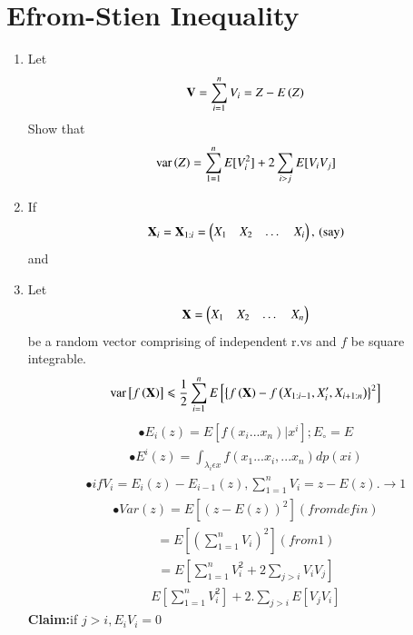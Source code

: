 \documentclass[journal,12pt,twocolumn]{IEEEtran}
\renewcommand\thesection{\arabic{section}}
\begin{document}
\section{Efrom-Stien Inequality}
\begin{enumerate}[label=\thesection.\arabic*,ref=\thesection.\theenumi]
\item Let
\begin{align}
\mathbf{V}= \sum_{i=1}^{n}{V}_i = Z - E\left(Z\right)
\end{align}
Show that 
\begin{align}
\text{var} \left(Z\right) = \sum_{1=1}^{n}E[ V_i^2]+2\sum_{i>j}E[V_i V_j]
\end{align}
\item If
\begin{align}
\mathbf{X}_i = \mathbf{X}_{1:i}=\begin{pmatrix}X_1 & X_2 & \dots & X_i\end{pmatrix},\, \text{(say)}
\end{align}
%
and
\item Let
\begin{align}
\mathbf{X}= \begin{pmatrix}X_1 & X_2 &  \dots & X_n\end{pmatrix}
\end{align}
be a random vector comprising of independent r.vs and $f$ be  square integrable.
\begin{align}
\text{var}{}\left[f\left(\mathbf{X}\right)\right] \leqslant \frac{1}{2}\sum_{i=1}^{n} E{}\left[\left\{f\left(\mathbf{X}\right)-f\left(X_{1:i-1},X_{i}^{\prime},X_{i+1:n}\right)\right\}^2\right]
\end{align}
\begin{align}
\bullet E_i(z)=E[f(x_i...x_n)|x^i]; E_\circ=E
\end{align}
\begin{align}
\bullet E^i(z)= \int_{\lambda_i \epsilon x} f(x_1...x_i,...x_n)dp(xi)
\end{align}
\begin{align}
\bullet if V_i=E_i(z)-E_{i-1}(z),\sum_{1=1}^{n} V_i=z-E(z).\rightarrow 1
\end{align}
\begin{align}
\bullet Var(z)=E[(z-E(z))^2] (from defin)
\end{align}
\begin{align}
=E[(\sum_{1=1}^{n} V_i)^2] (from 1)
\end{align}
\begin{align}
=E[\sum_{1=1}^{n} V_i^2 +2\sum_{j>i} V_i V _j]
\end{align}
\begin{align}
E[\sum_{1=1}^{n} V_i^2]+2.\sum_{j>i}E[V_j V_i]
\end{align}
\textbf{Claim:}if $j>i,E_i V_i=0$
\begin{align}

\end{align}
\end{enumerate}
\end{document}
